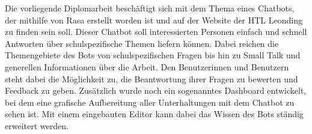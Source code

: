 Die vorliegende Diplomarbeit beschäftigt sich mit dem Thema eines Chatbots, der mithilfe von Rasa erstellt worden ist und auf der Website der HTL Leonding zu finden sein soll.
Dieser Chatbot soll interessierten Personen einfach und schnell Antworten über schulspezifische Themen liefern können.
Dabei reichen die Themengebiete des Bots von schulspezifischen Fragen bis hin zu Small Talk und generellen Informationen über die Arbeit.
Den Benutzerinnen und Benutzern steht dabei die Möglichkeit zu, die Beantwortung ihrer Fragen zu bewerten und Feedback zu geben.
Zusätzlich wurde noch ein sogenanntes Dashboard entwickelt, bei dem eine grafische Aufbereitung aller Unterhaltungen mit dem Chatbot zu sehen ist.
Mit einem eingebauten Editor kann dabei das Wissen des Bots ständig erweitert werden.